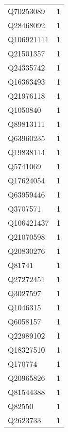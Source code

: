 \begin{tabular}{lr}
   Q70253089 &                             1 \\
   Q28468092 &                             1 \\
  Q106921111 &                             1 \\
   Q21501357 &                             1 \\
   Q24335742 &                             1 \\
   Q16363493 &                             1 \\
   Q21976118 &                             1 \\
    Q1050840 &                             1 \\
   Q89813111 &                             1 \\
   Q63960235 &                             1 \\
   Q19838114 &                             1 \\
    Q5741069 &                             1 \\
   Q17624054 &                             1 \\
   Q63959446 &                             1 \\
    Q3707571 &                             1 \\
  Q106421437 &                             1 \\
   Q21070598 &                             1 \\
   Q20830276 &                             1 \\
      Q81741 &                             1 \\
   Q27272451 &                             1 \\
    Q3027597 &                             1 \\
    Q1046315 &                             1 \\
    Q6058157 &                             1 \\
   Q22989102 &                             1 \\
   Q18327510 &                             1 \\
     Q170774 &                             1 \\
   Q20965826 &                             1 \\
   Q81544388 &                             1 \\
      Q82550 &                             1 \\
    Q2623733 &                             1 \\

\end{tabular}
